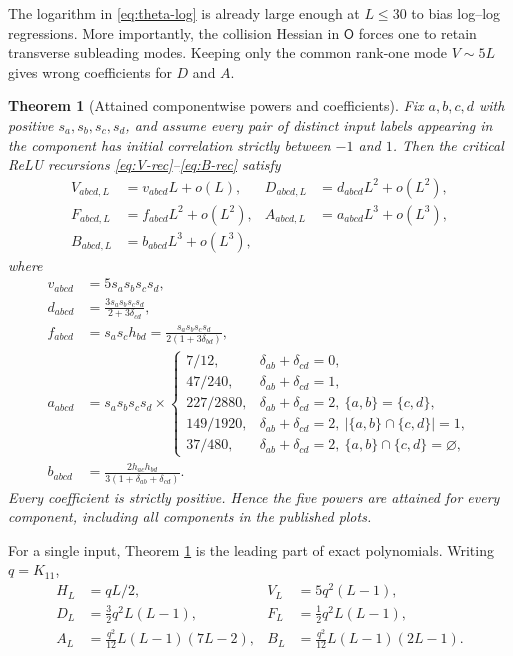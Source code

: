 \documentclass{article}
\newtheorem{theorem}{Theorem}[section]
\begin{document}
The logarithm in \eqref{eq:theta-log} is already large enough at
\(L\le30\) to bias log--log regressions.  More importantly, the collision
Hessian in \(\mathsf O\) forces one to retain transverse subleading modes.
Keeping only the common rank-one mode \(V\sim5L\) gives wrong coefficients
for \(D\) and \(A\).

\begin{theorem}[Attained componentwise powers and coefficients]
\label{thm:componentwise-powers}
Fix \(a,b,c,d\) with positive \(s_a,s_b,s_c,s_d\), and assume every pair of
distinct input labels appearing in the component has initial correlation
strictly between \(-1\) and \(1\).  Then the critical ReLU recursions
\eqref{eq:V-rec}--\eqref{eq:B-rec} satisfy
\begin{align}
V_{abcd,L}&=v_{abcd}L+o(L),&
D_{abcd,L}&=d_{abcd}L^2+o(L^2),\nonumber\\
F_{abcd,L}&=f_{abcd}L^2+o(L^2),&
A_{abcd,L}&=a_{abcd}L^3+o(L^3),\nonumber\\
B_{abcd,L}&=b_{abcd}L^3+o(L^3),
\label{eq:tensor-asymptotics}
\end{align}
where
\begin{align}
v_{abcd}&=5s_as_bs_cs_d,\label{eq:v-coeff}\\
d_{abcd}&=\frac{3s_as_bs_cs_d}{2+3\delta_{cd}},\label{eq:d-coeff}\\
f_{abcd}&=s_as_ch_{bd}
=\frac{s_as_bs_cs_d}{2(1+3\delta_{bd})},\label{eq:f-coeff}\\
a_{abcd}&=s_as_bs_cs_d\times
\begin{cases}
7/12,&\delta_{ab}+\delta_{cd}=0,\\
47/240,&\delta_{ab}+\delta_{cd}=1,\\
227/2880,&\delta_{ab}+\delta_{cd}=2,
\ \{a,b\}=\{c,d\},\\
149/1920,&\delta_{ab}+\delta_{cd}=2,
\ |\{a,b\}\cap\{c,d\}|=1,\\
37/480,&\delta_{ab}+\delta_{cd}=2,
\ \{a,b\}\cap\{c,d\}=\varnothing,
\end{cases}\label{eq:a-coeff}\\
b_{abcd}&=\frac{2h_{ac}h_{bd}}
{3(1+\delta_{ab}+\delta_{cd})}.\label{eq:b-coeff}
\end{align}
Every coefficient is strictly positive.  Hence the five powers are attained
for every component, including all components in the published plots.
\end{theorem}

For a single input, Theorem \ref{thm:componentwise-powers} is the leading
part of exact polynomials.  Writing \(q=K_{11}\),
\begin{align}
H_L&=qL/2,&V_L&=5q^2(L-1),\nonumber\\
D_L&=\frac32q^2L(L-1),&F_L&=\frac12q^2L(L-1),\nonumber\\
A_L&=\frac{q^2}{12}L(L-1)(7L-2),&
B_L&=\frac{q^2}{12}L(L-1)(2L-1).
\label{eq:single-input-polynomials}
\end{align}
\end{document}
